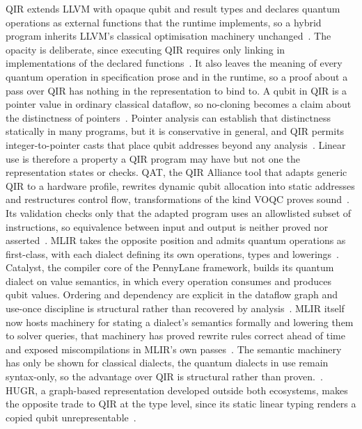 QIR extends LLVM with opaque qubit and result types and declares quantum operations as external functions that the runtime implements, so a hybrid program inherits LLVM's classical optimisation machinery unchanged~\cite{qir_alliance_qir_spec_repo, unknown2024towardsqir}.
The opacity is deliberate, since executing QIR requires only linking in implementations of the declared functions~\cite{unknown2024towardsqir}.
It also leaves the meaning of every quantum operation in specification prose and in the runtime, so a proof about a pass over QIR has nothing in the representation to bind to.
A qubit in QIR is a pointer value in ordinary classical dataflow, so no-cloning becomes a claim about the distinctness of pointers~\cite{unknown2024towardsqir}.
Pointer analysis can establish that distinctness statically in many programs, but it is conservative in general, and QIR permits integer-to-pointer casts that place qubit addresses beyond any analysis~\cite{unknown2024towardsqir}.
Linear use is therefore a property a QIR program may have but not one the representation states or checks.
QAT, the QIR Alliance tool that adapts generic QIR to a hardware profile, rewrites dynamic qubit allocation into static addresses and restructures control flow, transformations of the kind VOQC proves sound~\cite{qir_alliance_qat_goals_assumptions, hietala2023voqc}.
Its validation checks only that the adapted program uses an allowlisted subset of instructions, so equivalence between input and output is neither proved nor asserted~\cite{qir_alliance_qat_goals_assumptions}.
MLIR takes the opposite position and admits quantum operations as first-class, with each dialect defining its own operations, types and lowerings~\cite{McCaskey2021MLIRDialectQASM}.
Catalyst, the compiler core of the PennyLane framework, builds its quantum dialect on value semantics, in which every operation consumes and produces qubit values.
Ordering and dependency are explicit in the dataflow graph and use-once discipline is structural rather than recovered by analysis~\cite{PennyLaneCatalystMLIRDialectsDocs}.
MLIR itself now hosts machinery for stating a dialect's semantics formally and lowering them to solver queries, that machinery has proved rewrite rules correct ahead of time and exposed miscompilations in MLIR's own passes~\cite{fehr2025verificationdialects}.
The semantic machinery has only be shown for classical dialects, the quantum dialects in use remain syntax-only, so the advantage over QIR is structural rather than proven.~\cite{fehr2025verificationdialects}.
HUGR, a graph-based representation developed outside both ecosystems, makes the opposite trade to QIR at the type level, since its static linear typing renders a copied qubit unrepresentable~\cite{hugr2025quantumclassicalir}.
